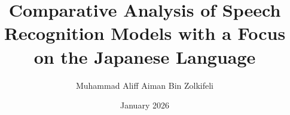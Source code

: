 \newcommand{\vsp}{\textvisiblespace} %

\newcommand{\ins}[1]{\textcolor{green!55!black}{[+#1+]}}
\newcommand{\del}[1]{\textcolor{red!70!black}{[-#1-]}}
\newcommand{\rep}[2]{\textcolor{yellow!85!black}{[#1$\rightarrow$#2]}}




\newtheorem{theorem}{Theorem}[chapter]
\newtheorem{corollary}{Corollary}[theorem]
\newtheorem{lemma}[theorem]{Lemma}
\newtheorem{remark}{Remark}[chapter]
\theoremstyle{definition}\newtheorem{definition}{Definition}[section]
\newtheorem{example}{Example}[chapter]
\newenvironment{solution}{%
    \let\oldqedsymbol=\qedsymbol%
    \def\@addpunct##1{}%
    \renewcommand{\qedsymbol}{$\blacktriangleleft$}%
    \begin{proof}[\bfseries\upshape Solution]}%
    {\end{proof}%
    \renewcommand{\qedsymbol}{\oldqedsymbol}}
            
\title{Comparative Analysis of Speech Recognition Models with a Focus on the Japanese Language}
\author{Muhammad Aliff Aiman Bin Zolkifeli}
\date{January 2026}



